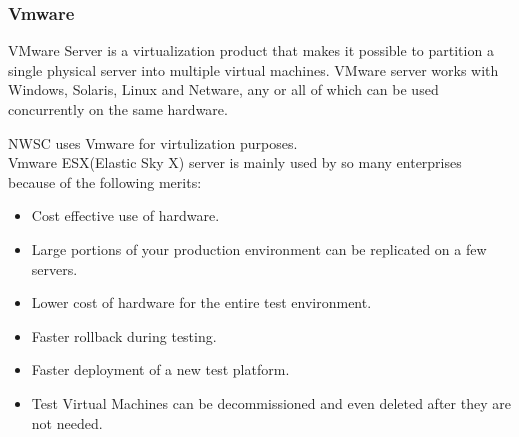 \documentclass{article}
\begin{document}
\subsubsection{Vmware}\cite{muller2005virtualization}
VMware Server is a virtualization product that makes it possible to partition a single physical server into multiple virtual machines. VMware server works with Windows, Solaris, Linux and Netware, any or all of which can be used concurrently on the same hardware.
\par NWSC uses Vmware for virtulization purposes.\\
Vmware ESX(Elastic Sky X) server  is mainly used by so many enterprises  because of the following merits:
\begin{itemize}
\item Cost effective use of hardware.
\item  Large portions of your production environment can be replicated on a few servers.
\item  Lower cost of hardware for the entire test environment.
\item  Faster rollback during testing.
\item  Faster deployment of a new test platform.
\item Test Virtual Machines can be decommissioned and even deleted after they are not needed.
\end{itemize} \cite{muller2005virtualization}
\end{document}
